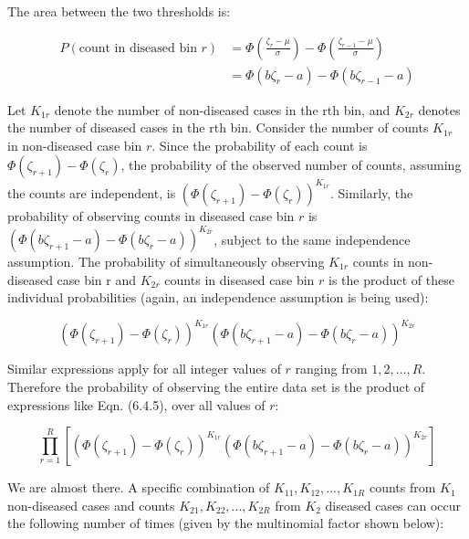 \documentclass[
]{book}
\begin{document}
The area between the two thresholds is:

\begin{align*} 
P\left ( \text{count in diseased bin }r \right ) &= \Phi\left ( \frac{\zeta_r - \mu}{\sigma} \right ) - \Phi\left ( \frac{\zeta_{r-1} - \mu}{\sigma} \right ) \\
&= \Phi\left ( b\zeta_r-a \right ) - \Phi\left ( b\zeta_{r-1}-a \right )
\end{align*}

Let \(K_{1r}\) denote the number of non-diseased cases in the rth bin, and \(K_{2r}\) denotes the number of diseased cases in the rth bin. Consider the number of counts \(K_{1r}\) in non-diseased case bin \(r\). Since the probability of each count is \(\Phi\left ( \zeta_{r+1} \right ) - \Phi\left ( \zeta_r \right )\), the probability of the observed number of counts, assuming the counts are independent, is \({\left(\Phi\left ( \zeta_{r+1} \right ) - \Phi\left ( \zeta_r \right ) \right )}^{K_{1r}}\). Similarly, the probability of observing counts in diseased case bin \(r\) is \({\left (\Phi\left ( b\zeta_{r+1}-a \right ) - \Phi\left ( b\zeta_r-a \right ) \right )}^{K_{2r}}\), subject to the same independence assumption. The probability of simultaneously observing \(K_{1r}\) counts in non-diseased case bin r and \(K_{2r}\) counts in diseased case bin \(r\) is the product of these individual probabilities (again, an independence assumption is being used):

\begin{equation*} 
\left (\Phi\left ( \zeta_{r+1}  \right ) - \Phi\left ( \zeta_r  \right )  \right )^{K_{1r}} \left (\Phi\left ( b\zeta_{r+1}-a  \right ) - \Phi\left ( b\zeta_r-a  \right )  \right )^{K_{2r}}
\end{equation*}

Similar expressions apply for all integer values of \(r\) ranging from \(1,2,...,R\). Therefore the probability of observing the entire data set is the product of expressions like Eqn. (6.4.5), over all values of \(r\):

\begin{equation} 
\prod_{r=1}^{R}\left [\left (\Phi\left ( \zeta_{r+1}  \right ) - \Phi\left ( \zeta_r  \right )  \right )^{K_{1r}} \left (\Phi\left ( b\zeta_{r+1}-a  \right ) - \Phi\left ( b\zeta_r-a  \right )  \right )^{K_{2r}}  \right ]
\label{eq:binormal-modelProductProb}
\end{equation}

We are almost there. A specific combination of \(K_{11},K_{12},...,K_{1R}\) counts from \(K_1\) non-diseased cases and counts \(K_{21},K_{22},...,K_{2R}\) from \(K_2\) diseased cases can occur the following number of times (given by the multinomial factor shown below):
\end{document}
